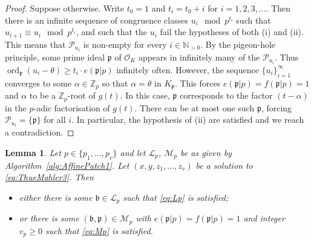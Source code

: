 \documentclass[11pt]{report}
\newtheorem{lemma}[theorem]{Lemma}
\theoremstyle{definition}
\DeclareMathOperator{\ord}{ord}
\begin{document}
\begin{proof}
Suppose otherwise. Write $t_0=1$ and $t_i=t_0+i$ for $i=1,2,3,\dots$. Then there is an infinite sequence of congruence classes $u_i \mod{p^{t_i}}$ such that ${u_{i+1} \equiv u_i \mod{p^{t_i}}}$, and such that the $u_i$ fail the hypotheses of both (i) and (ii). This means that $\mathcal{P}_{u_i}$ is non-empty for every $i \in \mathbb{N}_{>0}$. By the pigeon-hole principle, some prime ideal $\mathfrak{p}$ of $\mathcal{O}_K$ appears in infinitely many of the $\mathcal{P}_{u_i}$. Thus ${\ord_{\mathfrak{p}}(u_i-\theta) \ge t_i\cdot e(\mathfrak{p}|p)}$ infinitely often. However, the sequence $\{u_i\}_{i=1}^{\infty}$ converges to some $\alpha \in \mathbb{Z}_p$ so that $\alpha=\theta$ in $K_\mathfrak{p}$. This forces $e(\mathfrak{p}|p)=f(\mathfrak{p}|p)=1$ and $\alpha$ to be a $\mathbb{Z}_p$-root of $g(t)$. In this case, $\mathfrak{p}$ corresponds to the factor $(t-\alpha)$ in the $p$-adic factorisation of $g(t)$. There can be at most one such $\mathfrak{p}$, forcing $\mathcal{P}_{u_i}=\{\mathfrak{p}\}$ for all $i$. In particular, the hypothesis of (ii) are satisfied and we reach a contradiction.
\end{proof}

\begin{lemma}\label{lem:AffinePatch1Check}
Let $p \in \{p_1, \dots, p_v\}$ and let $\mathcal{L}_p$, $\mathcal{M}_p$ be as given by Algorithm~\ref{alg:AffinePatch1}. Let $(x,y,z_1,\dots, z_v)$ be a solution to \eqref{eq:ThueMahler3}. Then
\begin{itemize}
\item either there is some $\mathfrak{b} \in \mathcal{L}_p$ such that \eqref{eq:Lp} is satisfied;
\item or there is some $(\mathfrak{b},\mathfrak{p}) \in \mathcal{M}_p$ with $e(\mathfrak{p}|p)=f(\mathfrak{p}|p)=1$ and integer $v_p \geq 0$ such that \eqref{eq:Mp} is satisfied.
\end{itemize}
\end{lemma}
\end{document}
